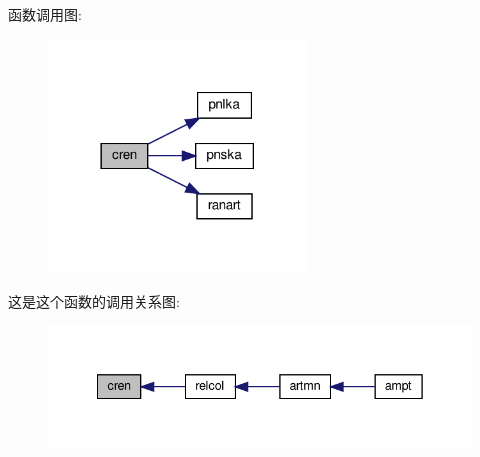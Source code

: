 函数调用图\+:
\nopagebreak
\begin{figure}[H]
\begin{center}
\leavevmode
\includegraphics[width=194pt]{cren_8f90_a6d1de3f2c087987dd12031298f5e3b6a_cgraph}
\end{center}
\end{figure}
这是这个函数的调用关系图\+:
\nopagebreak
\begin{figure}[H]
\begin{center}
\leavevmode
\includegraphics[width=342pt]{cren_8f90_a6d1de3f2c087987dd12031298f5e3b6a_icgraph}
\end{center}
\end{figure}
